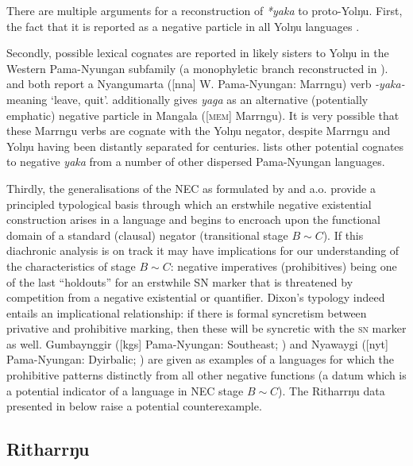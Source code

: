 \documentclass[output=paper]{langsci/langscibook}
\begin{document}
There are multiple arguments for a reconstruction of \textit{*yaka} to proto-Yolŋu. First, the fact that it is reported as a negative particle in all Yolŋu languages \citep[31]{Schebeck2001}.

Secondly, possible lexical cognates are reported in likely sisters to Yolŋu
in the Western Pama-Nyungan subfamily (a monophyletic branch reconstructed
in \citealt[838]{Bowern2012}). \citet[226]{Sharp2004} and
\citet[67]{Ogrady1963} both report a Nyangumarta ([nna] W.
Pama-Nyungan: Marrngu) verb \textit{-yaka-} meaning `leave, quit'.
\citet[35]{Mckelson1974} additionally gives \textit{yaga} as an alternative
(potentially emphatic) negative particle in Mangala ([\textsc{mem}] Marrngu). It is very possible that these Marrngu verbs are cognate with the Yolŋu negator, despite Marrngu and Yolŋu having been distantly separated for centuries. \citet[85]{Dixon2002a} lists other potential cognates to negative \textit{yaka} from a number of other dispersed Pama-Nyungan languages.
 
Thirdly, the generalisations of the NEC as formulated by \citet{Croft1991}
and \citet{Veselinova2016} a.o. provide a principled typological basis
through which an erstwhile negative existential construction arises in a
language and begins to encroach upon the functional domain of a standard
(clausal) negator (transitional stage $B\sim C$). If this diachronic
analysis is on track it may have implications for our understanding of the
characteristics of stage $B\sim C$: negative imperatives (prohibitives)
being one of the last ``holdouts'' for an erstwhile SN marker that is
threatened by competition from a negative existential or quantifier.
Dixon's typology \citeyearpar[84]{Dixon2002a} indeed entails an
implicational relationship: if there is formal syncretism between privative
and prohibitive marking, then these will be syncretic with the \textsc{sn}
marker as well. Gumbaynggir ([kgs] Pama-Nyungan: Southeast;
\citealt{Eades1979}) and Nyawaygi ([nyt] Pama-Nyungan:
Dyirbalic; \citealt{Dixon1983}) are given as examples of a
languages for which the prohibitive patterns distinctly from all other
negative functions (a datum which is a potential indicator of a language in
NEC stage $B\sim C$). The Ritharrŋu data presented in  below raise a potential counterexample.

\subsection{Ritharrŋu}\label{sec:austr-4.2}
\end{document}
